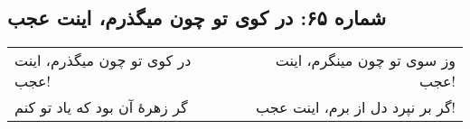 \begin{center}
\section*{شماره ۶۵: در کوی تو چون میگذرم، اینت عجب}
\label{sec:065}
\begin{longtable}{l p{0.5cm} r}
در کوی تو چون میگذرم، اینت عجب!
&&
وز سوی تو چون مینگرم، اینت عجب!
\\
گر زهرهٔ آن بود که یاد تو کنم
&&
گر بر نپرد دل از برم، اینت عجب!
\\
\end{longtable}
\end{center}
